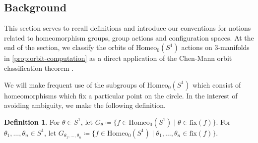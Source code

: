 \documentclass[10pt, oneside]{article}
\newcommand{\homeo}[1][S^1]{\text{Homeo}_0(#1)}
\newcommand{\conf}[2][S^1]{\text{Conf}_{#2}(#1)}
\newcommand{\dimn}[1]{\text{dim}(#1)}
\theoremstyle{definition}
\newtheorem{defn}{Definition}[section]
\theoremstyle{definition}
\begin{document}



\subsection{Background}
This section serves to recall definitions and introduce our conventions for notions related to homeomorphism groups, group actions and configuration spaces. At the end of the section, we classify the orbits of $\homeo$ actions on 3-manifolds in \cref{prop:orbit-computation} as a direct application of the Chen-Mann orbit classification theorem \cite{chen:StructureTheorems}.

We will make frequent use of the subgroups of $\homeo$ which consist of homeomorphisms which fix a particular point on the circle. In the interest of avoiding ambiguity, we make the following definition.

\begin{defn}
     For $\theta\in S^1$, let $G_\theta\coloneqq\{f\in\homeo[S^1]\;\vert\; \theta\in\text{fix}(f)\}$.
     For $\theta_1,\dots,\theta_n\in S^1$, let $G_{\theta_1,\dots,\theta_n}\coloneqq \{f\in\homeo\;\vert\; \theta_1,\dots,\theta_n\in\text{fix}(f)\}$.
\end{defn}
\end{document}
